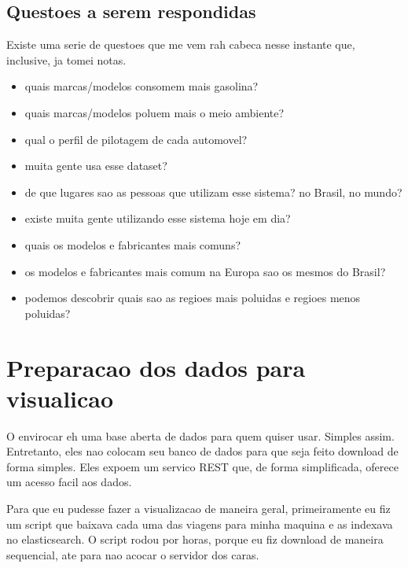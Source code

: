 \documentclass[10pt, conference]{IEEEtran}
\begin{document}
\begin{itemize}
\begin{itemize}
  \end{itemize}    

\end{itemize}




\subsection{Questoes a serem respondidas}
Existe uma serie de questoes que me vem rah cabeca nesse instante que,
inclusive, ja tomei notas.

\begin{itemize}
  \item quais marcas/modelos consomem mais gasolina?
  \item quais marcas/modelos poluem mais o meio ambiente?
  \item qual o perfil de pilotagem de cada automovel?
  \item muita gente usa esse dataset?
  \item de que lugares sao as pessoas que utilizam esse sistema? no Brasil, no mundo?
  \item existe muita gente utilizando esse sistema hoje em dia?
  \item quais os modelos e fabricantes mais comuns?
  \item os modelos e fabricantes mais comum na Europa sao os mesmos do Brasil?
  \item podemos descobrir quais sao as regioes mais poluidas e regioes menos poluidas?
\end{itemize}




\section{Preparacao dos dados para visualicao}

O envirocar eh uma base aberta de dados para quem quiser usar. Simples assim. Entretanto,
eles nao colocam seu banco de dados para que seja feito download de forma simples. Eles 
expoem um servico REST que, de forma simplificada, oferece um acesso facil aos dados.

Para que eu pudesse fazer a visualizacao de maneira geral, primeiramente eu fiz um script
que baixava cada uma das viagens para minha maquina e as indexava no elasticsearch. O script
rodou por horas, porque eu fiz download de maneira sequencial, ate para nao acocar o servidor
dos caras.
\end{document}
